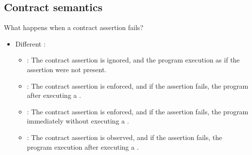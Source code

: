 \subsection{Contract semantics}

\begin{frame}[t,fragile]{What happens when a contract assertion fails?}
  \begin{itemize}
    \item Different :
      \begin{itemize}
        \item {}: The contract assertion is ignored, and the program  execution as if the assertion were not present.

        \item {}: The contract assertion is enforced, and if the assertion fails, the program  after executing a .

        \item {}: The contract assertion is enforced, and if the assertion fails, the program  immediately without executing a .

        \item {}: The contract assertion is observed, and if the assertion fails, the program  execution after executing a .
      \end{itemize}
  \end{itemize}
\end{frame}

